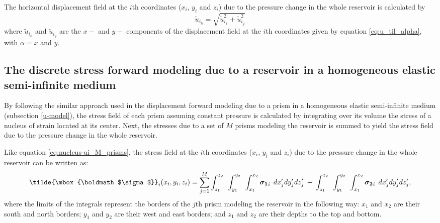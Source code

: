 \documentclass[journal abbreviation, manuscript]{copernicus}
\begin{document}
The horizontal displacement field at the $i$th coordinates ($x_i$, $y_i$  and $z_i$) due to the pressure change in the whole reservoir is calculated by 
\begin{equation}
{\tilde{u}}_{{i}_h} = \sqrt{ {\tilde{u}}_{{i}_x}^{2}  +  {\tilde{u}}_{{i}_y}^{2} }  
\label{eq:horizontal_displacement}
\end{equation}
where ${\tilde{u}}_{{i}_x}$ and ${\tilde{u}}_{{i}_y}$ are the $x-$ and $y-$ components of the displacement field at the $i$th coordinates given by equation \ref{eq:u_til_alpha}, with $\alpha = x $ and $y$.


\subsection{The discrete stress forward modeling due to a reservoir in a homogeneous elastic semi-infinite medium}

By following the similar approach used in the displacement forward modeling due to a prism in a homogeneous elastic semi-infinite medium (subsection \ref{u-model}), the stress field of each prism assuming constant pressure is calculated by integrating over its volume the stress of a nucleus of strain located at its center. 
Next, the stresses due to a set of $M$ prisms modeling the reservoir is summed to yield the stress field  due to the pressure change in the whole reservoir.

Like equation \ref{eq:nucleus-ui_M_prisms}, the stress field at the $i$th coordinates ($x_i$, $y_i$  and $z_i$) due to the pressure change in the whole reservoir can be written as:
\begin{equation}
\tilde{\mbox{\boldmath$\sigma$}}_{i}(x_i,y_i,z_i)
= \sum_{j=1}^{M} 
\int_{z_1}^{z_2} \:\:
\int_{y_1}^{y_2} \:\: 
\int_{x_1}^{x_2} 
\mbox{\boldmath$\sigma_{1}$}_{i}\: \:  dx^{\prime}_j dy^{\prime}_j dz^{\prime}_j 
\: + \: 
\int_{z_1}^{z_2} \:\:
\int_{y_1}^{y_2} \:\: 
\int_{x_1}^{x_2} 
\mbox{\boldmath$\sigma_{2}$}_{i} \:\:  dx^{\prime}_j dy^{\prime}_j dz^{\prime}_j, 
\label{eq:nucleus-stress_M_prisms}
\end{equation}
where the limits of the integrals represent the borders of the $j$th prism modeling the reservoir in the following way: $x_1$ and $x_2$ are their south and north borders; $y_1$ and  $y_2$ are their  west and east borders;  and $z_1$ and $z_2$ are their depths to the top and bottom.
\end{document}
